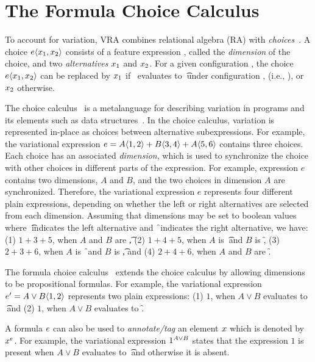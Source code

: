 \section{The Formula Choice Calculus}
\label{sec:fcc}

To account for variation, VRA combines relational algebra (RA) with 
\emph{choices}~\cite{EW11tosem,HW16fosd,Walk13thesis}.
A choice $\chc{\elem_1,\elem_2}$ consists of a feature expression \dimMeta, called
the \emph{dimension} of the choice, and 
two \emph{alternatives} $\elem_1$ and $\elem_2$. For a given configuration \config, 
the choice $\chc{\elem_1, \elem_2}$ can be replaced by $\elem_1$ if \dimMeta\
evaluates to \t\ under configuration \config, (i.e., \fSem{\dimMeta}),
or $\elem_2$ otherwise. 


The choice calculus~\cite{Walk13thesis,EW11tosem} is a metalanguage for
describing variation in programs and its elements such as data 
structures~\cite{Walk14onward,EWC13fosd}.
In the choice calculus, variation is represented in-place as
choices between alternative subexpressions. For example, 
the variational expression 
$e = \chc [A] {1,2} + \chc [B] {3,4} + \chc [A] {5,6}$
 contains three choices.
Each choice has an associated \emph{dimension}, which is used to
synchronize the choice with other choices in different parts
of the expression. For example, expression $e$ contains
two dimensions, $A$ and $B$, and the two choices in dimension
$A$ are synchronized. Therefore, the variational expression
$e$ represents four different plain expressions, depending
on whether the left or right alternatives are selected from each
dimension. Assuming that dimensions may be set to boolean values
where \t\ indicates the left alternative and \f\ indicates the
right alternative, we
have: (1) $1+3+5$, when $A$ and $B$ are \t,
(2) $1+4+5$, when $A$ is \t\ and $B$ is \f,
(3) $2+3+6$, when $A$ is \f\ and $B$ is \t,
and (4) $2+4+6$, when $A$ and $B$ are \f.

%
The formula
choice calculus~\cite{HW16fosd} extends the choice calculus 
by allowing dimensions to be propositional formulas. For example,
the variational expression $e' = \chc [A \vee B] {1,2}$ represents
two plain expressions: (1) $1$, when $A \vee B$ evaluates to \t\
and (2) $1$, when $A \vee B$ evaluates to \f.

%
A formula $\dimMeta$ can also be used to \emph{annotate/tag} an element $\elem$
which is denoted by $\annot \elem$.
For example, the variational expression $\annot [A \vee B] 1$ states that 
the expression $1$ is present when $A \vee B$ evaluates to \t\ and otherwise it is absent. 


